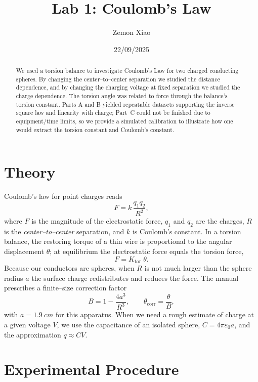 \documentclass[12pt]{article}
\title{Lab 1: Coulomb's Law}
\author{Zemon Xiao}
\date{22/09/2025}
\begin{document}
\maketitle

\begin{abstract}
We used a torsion balance to investigate Coulomb's Law for two charged conducting spheres. By changing the center--to--center separation we studied the distance dependence, and by changing the charging voltage at fixed separation we studied the charge dependence. The torsion angle was related to force through the balance's torsion constant. Parts A and B yielded repeatable datasets supporting the inverse--square law and linearity with charge; Part~C could not be finished due to equipment/time limits, so we provide a simulated calibration to illustrate how one would extract the torsion constant and Coulomb's constant.
\end{abstract}

\section*{Theory}
Coulomb's law for point charges reads
\begin{equation}
F = k\,\frac{q_1q_2}{R^2},
\end{equation}
where $F$ is the magnitude of the electrostatic force, $q_1$ and $q_2$ are the charges, $R$ is the \emph{center--to--center} separation, and $k$ is Coulomb's constant. In a torsion balance, the restoring torque of a thin wire is proportional to the angular displacement $\theta$; at equilibrium the electrostatic force equals the torsion force,
\begin{equation}
F = K_{\mathrm{tor}}\;\theta.
\end{equation}
Because our conductors are spheres, when $R$ is not much larger than the sphere radius $a$ the surface charge redistributes and reduces the force. The manual prescribes a finite--size correction factor
\begin{equation}
B = 1 - \frac{4a^3}{R^3},\qquad \theta_{\mathrm{corr}}=\frac{\theta}{B},
\end{equation}
with $a=\SI{1.9}{cm}$ for this apparatus. When we need a rough estimate of charge at a given voltage $V$, we use the capacitance of an isolated sphere, $C=4\pi\varepsilon_0 a$, and the approximation $q \approx C V$.

\section*{Experimental Procedure}
\end{document}
